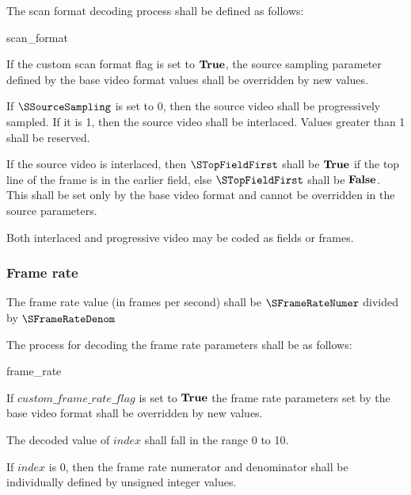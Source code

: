 The scan format decoding process shall be defined as follows:

\begin{pseudo}{scan\_format}{\VideoParams}
\bsEND
\end{pseudo}

If the custom scan format flag is set to $\text{\bf{True}}$, the source sampling 
parameter defined by the base video format values shall be overridden by new values.

If $\SSourceSampling$ is set to 0, then the source video shall be progressively 
sampled. If it is 1, then the source video shall be interlaced. Values greater than 1 shall be reserved.

If the source video is interlaced, then $\STopFieldFirst$ shall be $\text{\bf{True}}$ 
if the top line of the frame is in the earlier field, else $\STopFieldFirst$
 shall be $\text{\bf{False}}$. This shall be set only by the base video format and 
 cannot be overridden in the source parameters.

Both interlaced and progressive video may be coded as fields or frames.

\subsubsection{Frame rate}
\label{framerate}

The frame rate value (in frames per second) shall be 
$\SFrameRateNumer$ divided by $\SFrameRateDenom$

The process for decoding the frame rate parameters shall be as follows:

\begin{pseudo}{frame\_rate}{\VideoParams}
    \bsELSE
     \bsEND
\bsEND
\end{pseudo}

If $custom\_frame\_rate\_flag$ is set to $\text{\bf{True}}$ the frame rate parameters set
by the base video format shall be overridden by new values.

The decoded value of $index$ shall fall in the range 0 to 10.

If $index$ is 0, then the frame rate numerator and denominator shall be
individually defined by unsigned integer values.

